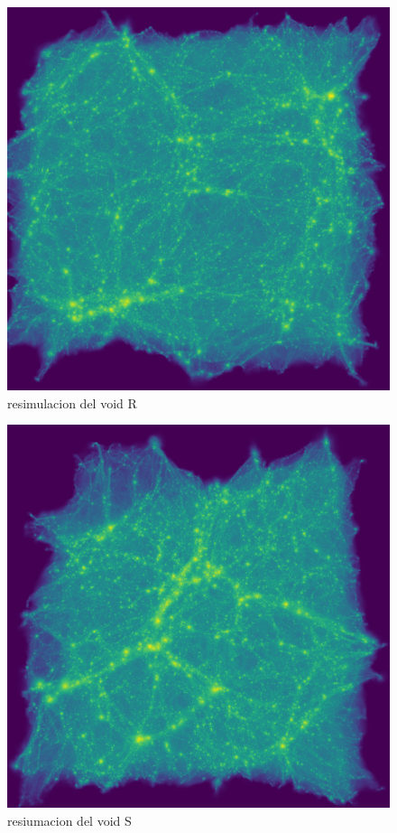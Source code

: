 \begin{figure}[h]
\centering
\includegraphics[width=15cm]{Figures/R1198_zoomin1.pdf}
\decoRule
\caption[asd]{resimulacion del void R }
\label{fig:Electron}
\end{figure}

\begin{figure}[h]
\centering
\includegraphics[width=15cm]{Figures/S1373_zoomin1.pdf}
\decoRule
\caption[asd]{resiumacion del void S }
\label{fig:Electron}
\end{figure}